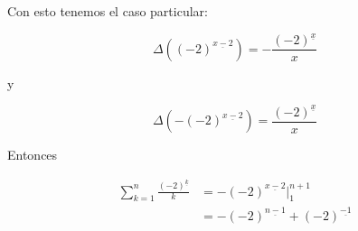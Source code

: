 \documentclass{article}
\begin{document}
Con esto tenemos el caso particular:

$$
\Delta((-2)^{\underline{x-2}}) = -\frac{(-2)^{\underline{x}}}{x}
$$

y

$$
\Delta(-(-2)^{\underline{x-2}}) = \frac{(-2)^{\underline{x}}}{x}
$$

Entonces

\begin{align*}
\sum_{k=1}^n \frac{(-2)^{\underline{k}}}{k} & = -(-2)^{\underline{x-2}} \Big |_{1}^{n+1} \\
  & = - (-2)^{\underline{n-1}} + (-2)^{\underline{-1}} \\
\end{align*}

\section{} %
\end{document}
